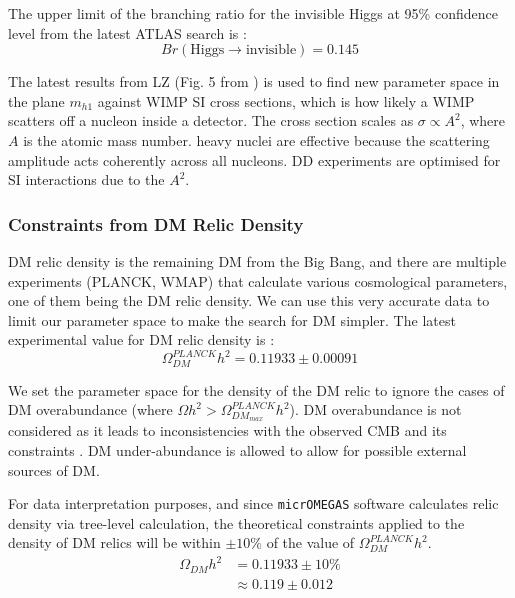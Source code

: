 \documentclass[12pt]{article}
\begin{document}
The upper limit of the branching ratio for the invisible Higgs at 95\% confidence level from the latest ATLAS search is \cite{ATLAS:2022yvh}:
\begin{equation}
    Br(\text{Higgs} \rightarrow \text{invisible}) = 0.145
    \label{eqn:branching_ratio}
\end{equation}

The latest results from LZ (Fig. 5 from \cite{aalbers2024darkmattersearchresults}) is used to find new parameter space in the plane $m_{h1}$ against WIMP SI cross sections, which is how likely a WIMP scatters off a nucleon inside a detector. The cross section scales as $\sigma \propto A^2$, where $A$ is the atomic mass number. heavy nuclei are effective because the scattering amplitude acts coherently across all nucleons. DD experiments are optimised for SI interactions due to the $A^2$.

\subsubsection{Constraints from DM Relic Density}
\label{sec:relic density}
DM relic density is the remaining DM from the Big Bang, and there are multiple experiments (PLANCK, WMAP) that calculate various cosmological parameters, one of them being the DM relic density. We can use this very accurate data to limit our parameter space to make the search for DM simpler. The latest experimental value for DM relic density is  \cite{Planck:2018vyg}:
\begin{equation}
    \Omega ^{PLANCK}_{DM} h^2 = 0.11933 \pm 0.00091
\end{equation}

We set the parameter space for the density of the DM relic to ignore the cases of DM overabundance (where $\Omega h^2 > \Omega^{PLANCK}_{DM_{max}}h^2$). DM overabundance is not considered as it leads to inconsistencies with the observed CMB and its constraints \cite{Croon_2024, Zavala_2010}. DM under-abundance is allowed to allow for possible external sources of DM.

For data interpretation purposes, and since \verb|micrOMEGAS| software calculates relic density via tree-level calculation, the theoretical constraints applied to the density of DM relics will be within $\pm10\%$ of the value of $\Omega ^{PLANCK}_{DM} h^2$.
\begin{equation}
    \begin{split}
        \Omega_{DM} h^2 &= 0.11933 \pm 10\% \\
        &\approx 0.119 \pm 0.012
    \end{split}
    \label{eqn:DM relic density value}
\end{equation}
\end{document}
